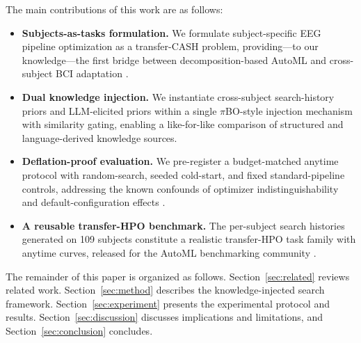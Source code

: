 
The main contributions of this work are as follows:
\begin{itemize}
    \item \textbf{Subjects-as-tasks formulation.} We formulate subject-specific EEG pipeline optimization as a transfer-CASH problem, providing---to our knowledge---the first bridge between decomposition-based AutoML \cite{LiEtAl2021b} and cross-subject BCI adaptation \cite{BerdyshevEtAl2024}.
    \item \textbf{Dual knowledge injection.} We instantiate cross-subject search-history priors and LLM-elicited priors within a single $\pi$BO-style injection mechanism with similarity gating, enabling a like-for-like comparison of structured and language-derived knowledge sources.
    \item \textbf{Deflation-proof evaluation.} We pre-register a budget-matched anytime protocol with random-search, seeded cold-start, and fixed standard-pipeline controls, addressing the known confounds of optimizer indistinguishability \cite{ZollerHuber2019} and default-configuration effects \cite{RodriguesEtAl2026}.
    \item \textbf{A reusable transfer-HPO benchmark.} The per-subject search histories generated on 109 subjects constitute a realistic transfer-HPO task family with anytime curves, released for the AutoML benchmarking community \cite{EggenspergerEtAl2021}.
\end{itemize}

The remainder of this paper is organized as follows. Section~\ref{sec:related} reviews related work. Section~\ref{sec:method} describes the knowledge-injected search framework. Section~\ref{sec:experiment} presents the experimental protocol and results. Section~\ref{sec:discussion} discusses implications and limitations, and Section~\ref{sec:conclusion} concludes.

